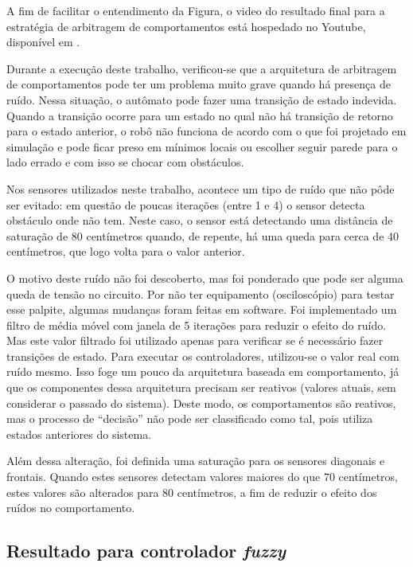 	
	
	A fim de facilitar o entendimento da Figura, o video do resultado final para a 
	estratégia de arbitragem de comportamentos está hospedado no Youtube, disponível 
	em .
	
	Durante a execução deste trabalho, verificou-se que a arquitetura de arbitragem de comportamentos pode ter 
	um problema muito grave quando há presença de ruído. Nessa situação, o autômato pode fazer uma transição de 
	estado indevida. Quando a transição ocorre para um estado no qual não há transição de retorno para o estado
	anterior, o robô não funciona de acordo com o que foi projetado em simulação e pode ficar preso em mínimos 
	locais ou escolher seguir parede para o lado errado e com isso se chocar com obstáculos.
	
	Nos sensores utilizados neste trabalho, acontece um tipo de ruído que não pôde ser evitado: em questão de 
	poucas iterações (entre 1 e 4) o sensor detecta obstáculo onde não tem. Neste caso, o sensor está detectando
	uma distância de saturação de 80 centímetros quando, de repente, há uma queda para cerca de 40 centímetros, que
	logo volta para o valor anterior. 
	
	O motivo deste ruído não foi descoberto, mas foi ponderado que pode ser alguma queda de tensão no circuito. 
	Por não ter equipamento (osciloscópio) para testar esse palpite, algumas mudanças foram feitas em software. 
	Foi implementado um filtro de média móvel com janela de 5 iterações para reduzir o efeito do ruído. Mas este
	valor filtrado foi utilizado apenas para verificar se é necessário fazer transições de estado. Para executar
	os controladores, utilizou-se o valor real com ruído mesmo. Isso foge um pouco da arquitetura baseada em 
	comportamento, já que os componentes dessa arquitetura precisam ser reativos (valores atuais, sem considerar 
	o passado do sistema). Deste modo, os comportamentos são reativos, mas o processo de ``decisão'' 
	não pode ser classificado como tal, pois utiliza estados anteriores do sistema.
	
	Além dessa alteração, foi definida uma saturação para os sensores diagonais e frontais. Quando estes sensores
	detectam valores maiores do que 70 centímetros, estes valores são alterados para 80 centímetros, a fim de
	reduzir o efeito dos ruídos no comportamento.  
	
	\subsection{Resultado para controlador \textit{fuzzy}}

